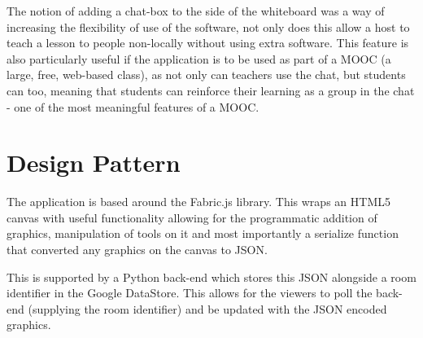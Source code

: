 The notion of adding a chat-box to the side of the whiteboard was a way of increasing the flexibility of use of the software, not only does this allow a host to teach a lesson to people non-locally without using extra software. This feature is also particularly useful if the application is to be used as part of a MOOC (a large, free, web-based class), as not only can teachers use the chat, but students can too, meaning that students can reinforce their learning as a group in the chat - one of the most meaningful features of a MOOC.

\section{Design Pattern}
The application is based around the Fabric.js library. This wraps an HTML5 canvas with useful functionality allowing for the programmatic addition of graphics, manipulation of tools on it and most importantly a serialize function that converted any graphics on the canvas to JSON.

This is supported by a Python back-end which stores this JSON alongside a room identifier in the Google DataStore. This allows for the viewers to poll the back-end (supplying the room identifier) and be updated with the JSON encoded graphics.